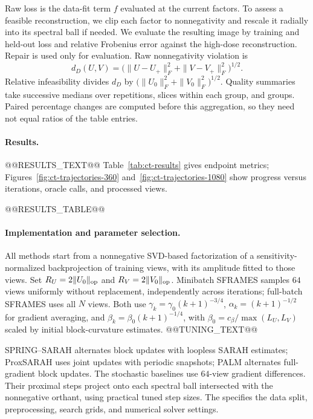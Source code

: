 Raw loss is the data-fit term \(f\) evaluated at the current factors.
To assess a feasible reconstruction, we clip each factor to
nonnegativity and rescale it radially into its spectral ball if needed.
We evaluate the resulting image by training and held-out loss and relative
Frobenius error against the high-dose reconstruction.
Repair is used only for evaluation. Raw nonnegativity violation is
\[
 d_D(U,V)=\bigl(\|U-U_+\|_F^2+\|V-V_+\|_F^2\bigr)^{1/2}.
\]
Relative infeasibility divides \(d_D\) by
\(\bigl(\|U_0\|_F^2+\|V_0\|_F^2\bigr)^{1/2}\).
Quality summaries take successive medians over repetitions, slices within
each group, and groups. Paired percentage changes are computed before this
aggregation, so they need not equal ratios of the table entries.

\paragraph{Results.}
@@RESULTS_TEXT@@
Table~\ref{tab:ct-results} gives endpoint metrics; Figures~\ref{fig:ct-trajectories-360}
and~\ref{fig:ct-trajectories-1080} show progress versus iterations, oracle calls,
and processed views.

@@RESULTS_TABLE@@

\paragraph{Implementation and parameter selection.}
All methods start from a nonnegative SVD-based factorization of a
sensitivity-normalized backprojection of training views, with its
amplitude fitted to those views. Set
\(R_U=2\|U_0\|_{\rm op}\) and \(R_V=2\|V_0\|_{\rm op}\).
Minibatch SFRAMES samples \(64\) views uniformly without replacement,
independently across iterations; full-batch SFRAMES uses all \(N\) views.
Both use \(\gamma_k=\gamma_0(k+1)^{-3/4}\),
\(\alpha_k=(k+1)^{-1/2}\) for gradient averaging, and
\(\beta_k=\beta_0(k+1)^{-1/4}\), with
\(\beta_0=c_\beta/\max(L_U,L_V)\) scaled by initial block-curvature estimates.
@@TUNING_TEXT@@

SPRING--SARAH alternates block updates with loopless SARAH estimates;
ProxSARAH uses joint updates with periodic snapshots; PALM alternates
full-gradient block updates. The stochastic baselines use \(64\)-view
gradient differences. Their proximal steps project onto each spectral
ball intersected with the nonnegative orthant, using practical tuned
step sizes. The \CTReproducibility{} specifies the data split,
preprocessing, search grids, and numerical solver settings.


